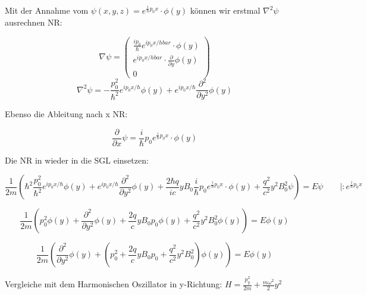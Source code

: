 Mit der Annahme vom \(\psi(x,y,z) = e^{\frac{i}{\hbar}p_0x}\cdot \phi(y)\) können wir erstmal \(\nabla^2\psi\) ausrechnen NR:

\[\nabla\psi = \begin{pmatrix} \frac{ip_0}{\hbar}e^{ip_0x/hbar}\cdot\phi(y)\\ e^{ip_0x/hbar}\cdot\frac{\partial}{\partial y}\phi(y)\\0\end{pmatrix}  \]
\[\nabla^2\psi =- \frac{p_0^2}{\hbar^2}e^{ip_0x/\hbar}\phi(y) + e^{ip_0x/\hbar}\frac{\partial^2}{\partial y^2}\phi(y)  \]

Ebenso die Ableitung nach x NR:

\[\frac{\partial}{\partial x}\psi =\frac{i}{\hbar}p_0 e^{\frac{i}{\hbar}p_0x}\cdot \phi(y) \]


Die NR in wieder in die SGL einsetzen:


\[ \frac{1}{2m}\left(\hbar^2 \frac{p_0^2}{\hbar^2}e^{ip_0x/\hbar}\phi(y) + e^{ip_0x/\hbar}\frac{\partial^2}{\partial y^2}\phi(y)  + \frac{2 \hbar q}{ic} yB_0\frac{i}{\hbar}p_0 e^{\frac{i}{\hbar}p_0x}\cdot \phi(y)  + \frac{q^2}{c^2}y^2B_0^2\psi \right) = E\psi \qquad | :e^{\frac{i}{\hbar}p_0x} \]

\[ \frac{1}{2m}\left(p_0^2\phi(y) + \frac{\partial^2}{\partial y^2}\phi(y)  + \frac{2 q}{c} yB_0p_0  \phi(y)  + \frac{q^2}{c^2}y^2B_0^2\phi(y) \right) = E \phi(y) \]


\[  \frac{1}{2m}\left( \frac{\partial^2}{\partial y^2}\phi(y) +  (p_0^2 + \frac{2 q}{c} yB_0p_0   + \frac{q^2}{c^2}y^2B_0^2)\phi(y) \right) = E \phi(y) \]


Vergleiche mit dem Harmonischen Oszillator in y-Richtung: \( H = \frac{p^2_y}{2m} + \frac{m\omega^2}{2}y^2 \)








